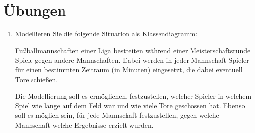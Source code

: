 \documentclass{lehramt-informatik}
\begin{document}
%

\section{Übungen}

\begin{enumerate}

%

\item Modellieren Sie die folgende Situation als Klassendiagramm:
\cite[Seite 1, Aufgae 2]{net:html:tu-dortmund:uebung-softwaretechnik}

Fußballmannschaften einer Liga bestreiten während einer
Meisterschaftsrunde Spiele gegen andere Mannschaften. Dabei werden in
jeder Mannschaft Spieler für einen bestimmten Zeitraum (in Minuten)
eingesetzt, die dabei eventuell Tore schießen.

Die Modellierung soll es ermöglichen, festzustellen, welcher Spieler in
welchem Spiel wie lange auf dem Feld war und wie viele Tore geschossen
hat. Ebenso soll es möglich sein, für jede Mannschaft festzustellen,
gegen welche Mannschaft welche Ergebnisse erzielt wurden.

\begin{center}
\end{center}

%


\end{enumerate}
\end{document}
